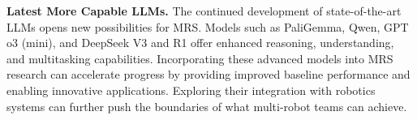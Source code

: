 \noindent\textbf{Latest More Capable LLMs.}
The continued development of state-of-the-art LLMs opens new possibilities for MRS. Models such as PaliGemma, Qwen, GPT o3 (mini), and DeepSeek V3 and R1 offer enhanced reasoning, understanding, and multitasking capabilities. Incorporating these advanced models into MRS research can accelerate progress by providing improved baseline performance and enabling innovative applications. Exploring their integration with robotics systems can further push the boundaries of what multi-robot teams can achieve.